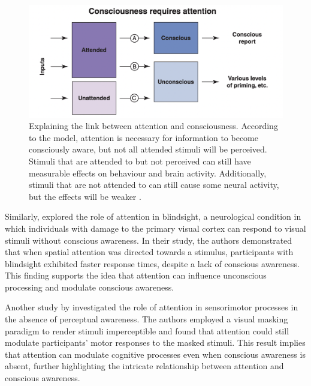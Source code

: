 \documentclass[10pt]{article}
\begin{document}
\begin{sloppypar}
  \begin{figure}[ht]
    \centering
    \includegraphics[width=\textwidth]{figures/attention.png}
    \caption[Explaining the link between attention and consciousness. According to the model, attention is necessary for information to become consciously aware, but not all attended stimuli will be perceived. Stimuli that are attended to but not perceived can still have measurable effects on behaviour and brain activity. Additionally, stimuli that are not attended to can still cause some neural activity, but the effects will be weaker.]{Explaining the link between attention and consciousness. According to the model, attention is necessary for information to become consciously aware, but not all attended stimuli will be perceived. Stimuli that are attended to but not perceived can still have measurable effects on behaviour and brain activity. Additionally, stimuli that are not attended to can still cause some neural activity, but the effects will be weaker \citep{cohen_attentional_2012}.}
    \label{fig:cohen-attention}
  \end{figure}

  Similarly, \cite{kentridge_spatial_2004} explored the role of attention in blindsight, a neurological condition in which individuals with damage to the primary visual cortex can respond to visual stimuli without conscious awareness. In their study, the authors demonstrated that when spatial attention was directed towards a stimulus, participants with blindsight exhibited faster response times, despite a lack of conscious awareness. This finding supports the idea that attention can influence unconscious processing and modulate conscious awareness.

  Another study by \cite{sumner_attentional_2006} investigated the role of attention in sensorimotor processes in the absence of perceptual awareness. The authors employed a visual masking paradigm to render stimuli imperceptible and found that attention could still modulate participants’ motor responses to the masked stimuli. This result implies that attention can modulate cognitive processes even when conscious awareness is absent, further highlighting the intricate relationship between attention and conscious awareness.


\end{sloppypar}
\end{document}
